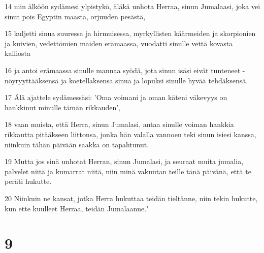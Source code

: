 \par 14 niin älköön sydämesi ylpistykö, äläkä unhota Herraa, sinun Jumalaasi, joka vei sinut pois Egyptin maasta, orjuuden pesästä,
\par 15 kuljetti sinua suuressa ja hirmuisessa, myrkyllisten käärmeiden ja skorpionien ja kuivien, vedettömien maiden erämaassa, vuodatti sinulle vettä kovasta kalliosta
\par 16 ja antoi erämaassa sinulle mannaa syödä, jota sinun isäsi eivät tunteneet - nöyryyttääksensä ja koetellaksensa sinua ja lopuksi sinulle hyvää tehdäksensä.
\par 17 Älä ajattele sydämessäsi: 'Oma voimani ja oman käteni väkevyys on hankkinut minulle tämän rikkauden',
\par 18 vaan muista, että Herra, sinun Jumalasi, antaa sinulle voiman hankkia rikkautta pitääkseen liittonsa, jonka hän valalla vannoen teki sinun isiesi kanssa, niinkuin tähän päivään saakka on tapahtunut.
\par 19 Mutta jos sinä unhotat Herran, sinun Jumalasi, ja seuraat muita jumalia, palvelet niitä ja kumarrat niitä, niin minä vakuutan teille tänä päivänä, että te peräti hukutte.
\par 20 Niinkuin ne kansat, jotka Herra hukuttaa teidän tieltänne, niin tekin hukutte, kun ette kuulleet Herraa, teidän Jumalaanne."

\chapter{9}

